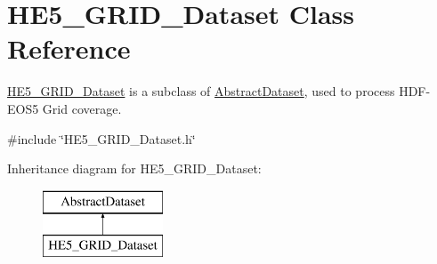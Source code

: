 \hypertarget{classHE5__GRID__Dataset}{
\section{HE5\_\-GRID\_\-Dataset Class Reference}
\label{classHE5__GRID__Dataset}
}


\hyperlink{classHE5__GRID__Dataset}{HE5\_\-GRID\_\-Dataset} is a subclass of \hyperlink{classAbstractDataset}{AbstractDataset}, used to process HDF-\/EOS5 Grid coverage.  




{\ttfamily \#include \char`\"{}HE5\_\-GRID\_\-Dataset.h\char`\"{}}

Inheritance diagram for HE5\_\-GRID\_\-Dataset:\begin{figure}[H]
\begin{center}
\leavevmode
\includegraphics[height=2.000000cm]{classHE5__GRID__Dataset}
\end{center}
\end{figure}
